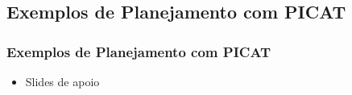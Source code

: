 \subsection{Exemplos de Planejamento com PICAT}

\begin{frame}

    \frametitle{Exemplos de Planejamento com PICAT}

    \begin{itemize}
    
      \item Slides de apoio
       
       
    \end{itemize}
\end{frame}

